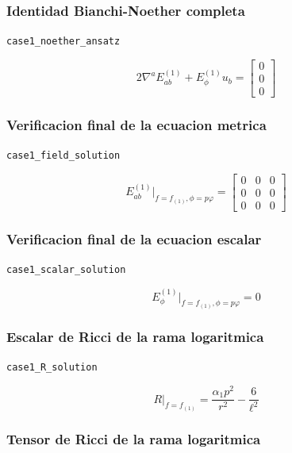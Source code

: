 \documentclass[11pt,a4paper]{article}
\begin{document}
\subsubsection{Identidad Bianchi-Noether completa}

\noindent\texttt{case1\_noether\_ansatz}\par\nopagebreak[4]

\[
2\nabla^aE^{(1)}_{ab}+E^{(1)}_\phi u_b = \left[\begin{matrix}0\\0\\0\end{matrix}\right]
\]

\subsubsection{Verificacion final de la ecuacion metrica}

\noindent\texttt{case1\_field\_solution}\par\nopagebreak[4]

\[
E^{(1)}_{ab}\big|_{f=f_{(1)},\phi=p\varphi} = \left[\begin{matrix}0 & 0 & 0\\0 & 0 & 0\\0 & 0 & 0\end{matrix}\right]
\]

\subsubsection{Verificacion final de la ecuacion escalar}

\noindent\texttt{case1\_scalar\_solution}\par\nopagebreak[4]

\[
E^{(1)}_\phi\big|_{f=f_{(1)},\phi=p\varphi} = 0
\]

\subsubsection{Escalar de Ricci de la rama logaritmica}

\noindent\texttt{case1\_R\_solution}\par\nopagebreak[4]

\[
R\big|_{f=f_{(1)}} = \frac{\alpha_{1} p^{2}}{r^{2}} - \frac{6}{\ell^{2}}
\]

\subsubsection{Tensor de Ricci de la rama logaritmica}
\end{document}
